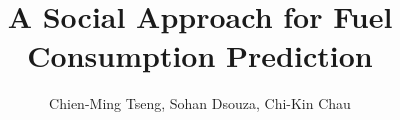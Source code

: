 \documentclass[preprint]{sig-alternate}
\begin{document}
\title{A Social Approach for Fuel Consumption Prediction}

\author{\alignauthor Chien-Ming Tseng, Sohan Dsouza, Chi-Kin Chau \\ \quad \\ 
 \\
} 



\makeatletter
\let\@copyrightspace\relax
\makeatother

\pagestyle{plain}
\thispagestyle{plain}

\maketitle


\begin{abstract}

\end{abstract}







{\scriptsize


}
\end{document}
